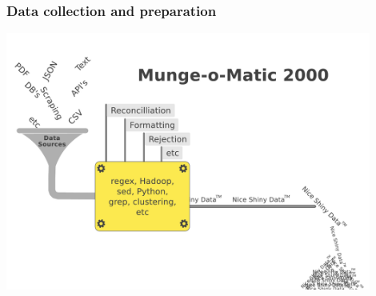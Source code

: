 \begin{frame}
\frametitle{Data collection and preparation}
\begin{center}


\includegraphics[width=0.9\textwidth]{graphics/data_preparation.pdf}

\end{center}
\end{frame}


